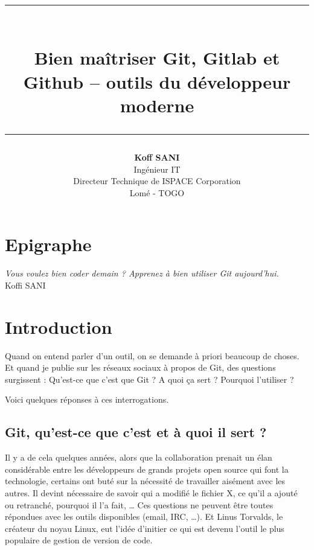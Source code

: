 \documentclass[11pt, a4paper]{book}
\author{\textbf{Koff SANI} \\ Ing\'enieur IT \\ Directeur Technique de ISPACE Corporation \\ Lomé - TOGO}
\begin{document}
\title{ \begin{figure} \begin{center}
 \end{center} \end{figure}
 \rule{13cm}{0.15cm}\\
  \textbf{\textbf{ Bien ma\^itriser Git, Gitlab et Github -- outils du développeur moderne }}\\ 
 \rule{13cm
}{0.15cm}
}
 
\date{}

\maketitle
\chapter*{Epigraphe}
\begin{flushright}
\emph{ Vous voulez bien coder demain ? Apprenez à bien utiliser Git aujourd'hui.}\\ Koffi SANI
\end{flushright}

\tableofcontents
\setcounter{tocdepth}{3}
\newcommand{\ud}{\mathrm{d}}
\newcommand{\lo}{\mathrm{Log}}
\newcommand{\arct}{\mathrm{Arctan}}

\chapter{Introduction}

Quand on entend parler d’un outil, on se demande à priori beaucoup de choses. Et quand je publie sur les réseaux sociaux à propos de Git, des questions surgissent : Qu’est-ce que c’est que Git ? A quoi ça sert ? Pourquoi l’utiliser ?

Voici quelques réponses à ces interrogations.
\section{Git, qu'est-ce que c'est et à quoi il sert ? }

Il y a de cela quelques années, alors que la collaboration prenait un élan considérable entre les développeurs de grands projets open source qui font la technologie, certains ont buté sur la nécessité de travailler aisément avec les autres. Il devint nécessaire de savoir qui a modifié le fichier X, ce qu’il a ajouté ou retranché, pourquoi il l’a fait, … Ces questions ne peuvent être toutes répondues avec les outils disponibles (email, IRC, …). Et Linus Torvalds, le créateur du noyau Linux, eut l’idée d’initier ce qui est devenu l’outil le plus populaire de gestion de version de code.
\end{document}
